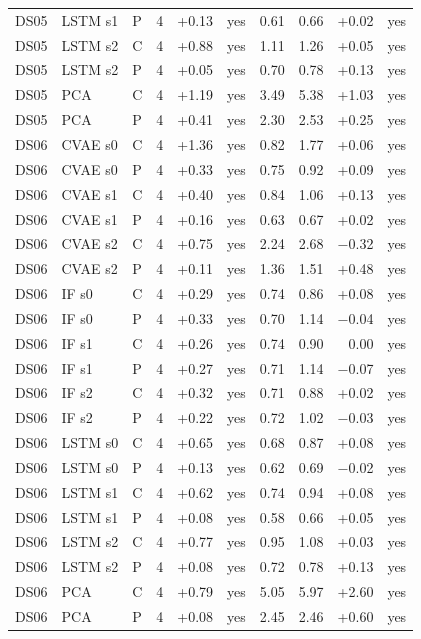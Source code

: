 \documentclass[10pt]{article}
\begin{document}
{\begin{longtable}{lllrrlrrrl}
DS05 & LSTM s1 & P & 4 & +0.13 & yes & 0.61 & 0.66 & +0.02 & yes \\
DS05 & LSTM s2 & C & 4 & +0.88 & yes & 1.11 & 1.26 & +0.05 & yes \\
DS05 & LSTM s2 & P & 4 & +0.05 & yes & 0.70 & 0.78 & +0.13 & yes \\
DS05 & PCA & C & 4 & +1.19 & yes & 3.49 & 5.38 & +1.03 & yes \\
DS05 & PCA & P & 4 & +0.41 & yes & 2.30 & 2.53 & +0.25 & yes \\
\midrule
DS06 & CVAE s0 & C & 4 & +1.36 & yes & 0.82 & 1.77 & +0.06 & yes \\
DS06 & CVAE s0 & P & 4 & +0.33 & yes & 0.75 & 0.92 & +0.09 & yes \\
DS06 & CVAE s1 & C & 4 & +0.40 & yes & 0.84 & 1.06 & +0.13 & yes \\
DS06 & CVAE s1 & P & 4 & +0.16 & yes & 0.63 & 0.67 & +0.02 & yes \\
DS06 & CVAE s2 & C & 4 & +0.75 & yes & 2.24 & 2.68 & −0.32 & yes \\
DS06 & CVAE s2 & P & 4 & +0.11 & yes & 1.36 & 1.51 & +0.48 & yes \\
DS06 & IF s0 & C & 4 & +0.29 & yes & 0.74 & 0.86 & +0.08 & yes \\
DS06 & IF s0 & P & 4 & +0.33 & yes & 0.70 & 1.14 & −0.04 & yes \\
DS06 & IF s1 & C & 4 & +0.26 & yes & 0.74 & 0.90 & 0.00 & yes \\
DS06 & IF s1 & P & 4 & +0.27 & yes & 0.71 & 1.14 & −0.07 & yes \\
DS06 & IF s2 & C & 4 & +0.32 & yes & 0.71 & 0.88 & +0.02 & yes \\
DS06 & IF s2 & P & 4 & +0.22 & yes & 0.72 & 1.02 & −0.03 & yes \\
DS06 & LSTM s0 & C & 4 & +0.65 & yes & 0.68 & 0.87 & +0.08 & yes \\
DS06 & LSTM s0 & P & 4 & +0.13 & yes & 0.62 & 0.69 & −0.02 & yes \\
DS06 & LSTM s1 & C & 4 & +0.62 & yes & 0.74 & 0.94 & +0.08 & yes \\
DS06 & LSTM s1 & P & 4 & +0.08 & yes & 0.58 & 0.66 & +0.05 & yes \\
DS06 & LSTM s2 & C & 4 & +0.77 & yes & 0.95 & 1.08 & +0.03 & yes \\
DS06 & LSTM s2 & P & 4 & +0.08 & yes & 0.72 & 0.78 & +0.13 & yes \\
DS06 & PCA & C & 4 & +0.79 & yes & 5.05 & 5.97 & +2.60 & yes \\
DS06 & PCA & P & 4 & +0.08 & yes & 2.45 & 2.46 & +0.60 & yes \\

\end{longtable}}
\end{document}
